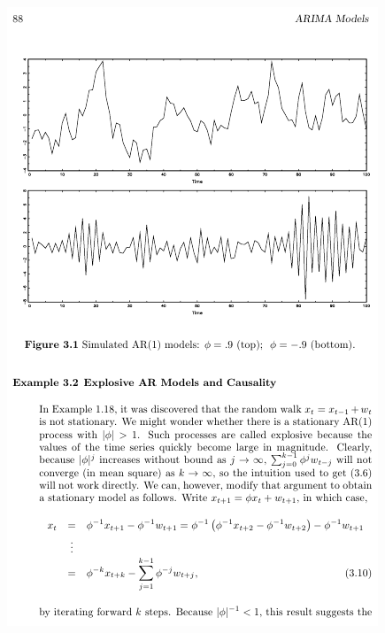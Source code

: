 \documentclass{article}
\begin{document}
\newpage\includegraphics[width=.9\textwidth]{shumway5}
\end{document}
